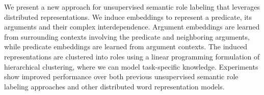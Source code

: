 We present a new approach for unsupervised semantic role labeling that leverages distributed representations.  We induce embeddings to represent a predicate, its arguments and their complex interdependence.  Argument embeddings are learned from surrounding contexts involving the predicate and neighboring arguments, while predicate embeddings are learned from argument contexts.  The induced representations are clustered into roles using a linear programming formulation of hierarchical clustering, where we can model task-specific knowledge.  Experiments show improved performance over both previous unsupervised semantic role labeling approaches and other distributed word representation models.

